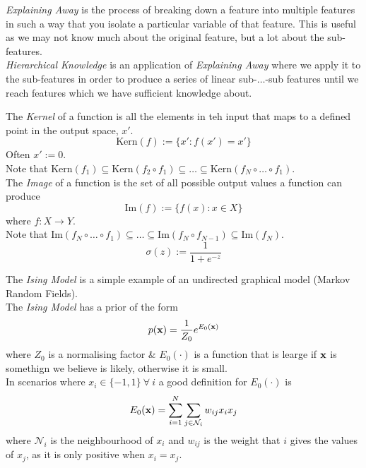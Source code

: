 \documentclass[11pt,a4paper]{article}
\begin{document}
\textit{Explaining Away} is the process of breaking down a feature into multiple features in such a way that you isolate a particular variable of that feature. This is useful as we may not know much about the original feature, but a lot about the sub-features.\\

\textit{Hierarchical Knowledge} is an application of \textit{Explaining Away} where we apply it to the sub-features in order to produce a series of linear sub-$\dots$-sub features until we reach features which we have sufficient knowledge about.


The \textit{Kernel} of a function is all the elements in teh input that maps to a defined point in the output space, $x'$.
$$\text{Kern}(f):=\{x':f(x')=x'\}$$
\nb Often $x':=0$.\\
Note that $\text{Kern}(f_1)\subseteq\text{Kern}(f_2\circ f_1)\subseteq\dots\subseteq\text{Kern}(f_N\circ\dots\circ f_1)$.\\

The \textit{Image} of a function is the set of all possible output values a function can produce
$$\text{Im}(f):=\{f(x):x\in X\}$$
where $f:X\to Y$.\\
Note that $\text{Im}(f_N\circ\dots\circ f_1)\subseteq\dots\subseteq\text{Im}(f_N\circ f_{N-1})\subseteq\text{Im}(f_N)$.\\

$$\sigma(z):=\frac{1}{1+e^{-z}}$$

The \textit{Ising Model} is a simple example of an undirected graphical model (Markov Random Fields).\\
The \textit{Ising Model} has a prior of the form
$$p(\textbf{x})=\frac{1}{Z_0}e^{E_0(\textbf{x})}$$
where $Z_0$ is a normalising factor \& $E_0(\cdot)$ is a function that is learge if $\textbf{x}$ is somethign we believe is likely, otherwise it is small.\\
In scenarios where $x_i\in\{-1,1\}\ \forall\ i$ a good definition for $E_0(\cdot)$ is
$$E_0(\textbf{x})=\sum_{i=1}^N\sum_{j\in\mathcal{N}_i}w_{ij}x_ix_j$$
where $\mathcal{N}_i$ is the neighbourhood of $x_i$ and $w_{ij}$ is the weight that $i$ gives the values of $x_j$, as it is only positive when $x_i=x_j$.\\
\end{document}
